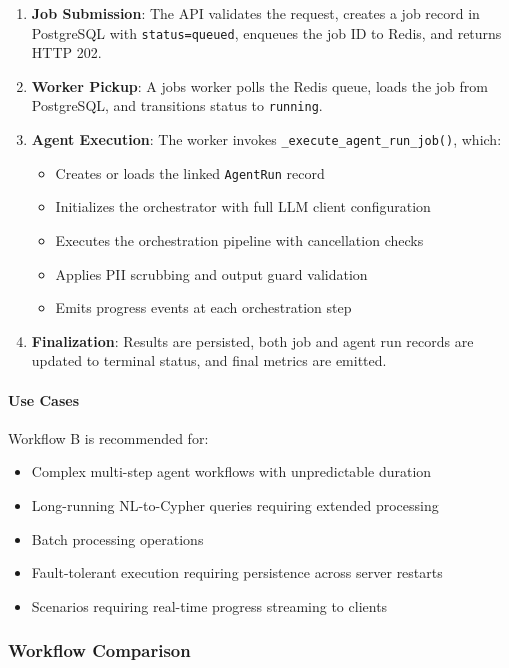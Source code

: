 \begin{enumerate}
    \item \textbf{Job Submission}: The API validates the request, creates a job record in PostgreSQL with \texttt{status=queued}, enqueues the job ID to Redis, and returns HTTP 202.
    \item \textbf{Worker Pickup}: A jobs worker polls the Redis queue, loads the job from PostgreSQL, and transitions status to \texttt{running}.
    \item \textbf{Agent Execution}: The worker invokes \texttt{\_execute\_agent\_run\_job()}, which:
    \begin{itemize}
        \item Creates or loads the linked \texttt{AgentRun} record
        \item Initializes the orchestrator with full LLM client configuration
        \item Executes the orchestration pipeline with cancellation checks
        \item Applies PII scrubbing and output guard validation
        \item Emits progress events at each orchestration step
    \end{itemize}
    \item \textbf{Finalization}: Results are persisted, both job and agent run records are updated to terminal status, and final metrics are emitted.
\end{enumerate}

\paragraph{Use Cases} Workflow B is recommended for:
\begin{itemize}
    \item Complex multi-step agent workflows with unpredictable duration
    \item Long-running NL-to-Cypher queries requiring extended processing
    \item Batch processing operations
    \item Fault-tolerant execution requiring persistence across server restarts
    \item Scenarios requiring real-time progress streaming to clients
\end{itemize}

\subsubsection{Workflow Comparison}

